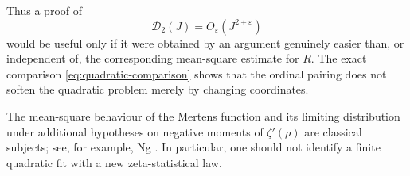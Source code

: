 \documentclass[11pt]{amsart}
\numberwithin{equation}{section}
\theoremstyle{plain}
\theoremstyle{definition}
\theoremstyle{remark}
\begin{document}
Thus a proof of
\begin{equation}
\label{eq:D2-target}
\mathcal D_2(J)=O_\varepsilon\!\left(J^{2+\varepsilon}\right)
\end{equation}
would be useful only if it were obtained by an argument genuinely easier than,
or independent of, the corresponding mean-square estimate for $R$.  The exact
comparison \eqref{eq:quadratic-comparison} shows that the ordinal pairing does
not soften the quadratic problem merely by changing coordinates.

The mean-square behaviour of the Mertens function and its limiting
distribution under additional hypotheses on negative moments of
$\zeta'(\rho)$ are classical subjects; see, for example, Ng
\cite{Ng2004}.  In particular, one should not identify a finite quadratic fit
with a new zeta-statistical law.
\end{document}
